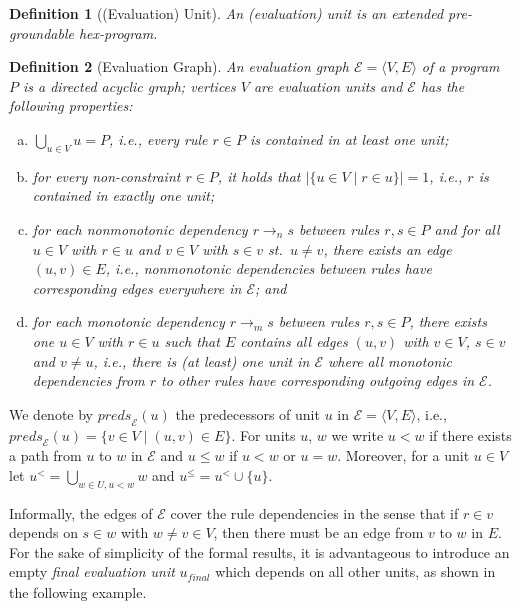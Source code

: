 \documentclass[11pt,fleqn,twoside]{article}
\newcommand\hex{{\sc hex}\xspace}
\newcommand{\Program}{\ensuremath{P}}
\newtheorem{definition}{Definition}
\begin{document}
{			\begin{definition}[(Evaluation) Unit]
				\label{def:evalunit}
				An \emph{(evaluation) unit} is an extended pre-groundable \hex{}-program.
			\end{definition}
			\begin{definition}[Evaluation Graph]
				\label{def:evalgraph}
				An \emph{evaluation graph} $\mathcal{E} = \langle V, E \rangle$ of a program $\Program$
				is a directed acyclic graph; vertices $V$ are evaluation units and $\mathcal{E}$ has the following properties:
				\begin{enumerate}[(a)]
					\item $\bigcup_{u \in V} u = \Program$, i.e., every rule $r \in \Program$ is contained in at least one unit;
					\item for every non-constraint $r \in \Program$, it holds that $\big|\{ u \in V \mid r \in u \}\big| = 1$, i.e.,
						$r$ is contained in exactly one unit;
					\item for each nonmonotonic dependency $r \rightarrow_n s$ between rules $r, s \in \Program$
						and for all $u \in V$ with $r \in u$ and $v \in V$ with $s \in v$ st.~$u \not=v$,
						there exists an edge $(u, v) \in E$, i.e., nonmonotonic dependencies between rules have
						corresponding edges everywhere in $\mathcal{E}$; and
					\item for each monotonic dependency $r \rightarrow_m s$ between rules $r, s \in \Program$,
						there exists one $u \in V$ with $r \in u$ such that $E$ contains all edges $(u, v)$ with $v \in V$, $s \in v$ and $v \not= u$,
						i.e., there is (at least) one unit in $\mathcal{E}$ where all monotonic dependencies from $r$ to other rules have
						corresponding outgoing edges in $\mathcal{E}$.
				\end{enumerate}
			\end{definition}
			
			We denote by $\mathit{preds}_{\mathcal{E}}(u)$ the predecessors of unit $u$ in $\mathcal{E} = \langle V, E \rangle$,
			i.e., $\mathit{preds}_{\mathcal{E}}(u) = \big\{ v \in V \mid (u, v) \in E \big\}$.
			For units $u$, $w$ we write $u < w$ if there exists a path from $u$ to $w$ in $\mathcal{E}$
			and $u \le w$ if $u < w$ or $u = w$.
			Moreover, for a unit $u \in V$ let $u^{<} = \bigcup_{w \in U, u < w} w$ and $u^{\le} = u^{<} \cup \{ u \}$.

			Informally, the edges of $\mathcal{E}$
			cover the rule dependencies in the sense that if $r \in v$ depends on $s \in w$ with $w \not= v \in V$,
			then there must be an edge from $v$ to $w$ in $E$.
			For the sake of simplicity of the formal results,
			it is advantageous to introduce an empty \emph{final evaluation unit} $u_{\mathit{final}}$ which depends
			on all other units, as shown in the following example.
			
}
\end{document}
